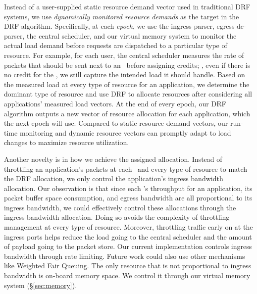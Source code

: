Instead of a user-supplied static resource demand vector used in traditional DRF systems, we use {\em dynamically monitored resource demands} as the target in the DRF algorithm.
Specifically, at each {\em epoch}, we use the ingress parser, egress de-parser, the central scheduler, and our virtual memory system to monitor the actual load demand before requests are dispatched to a particular type of resource.
For example, for each user, the central scheduler measures the rate of packets that should be sent next to an \nt\ before assigning credits; \ie, even if there is no credit for the \nt, we still capture the intended load it should handle.
Based on the measured load at every type of resource for an application, we determine the dominant type of resource and use DRF to allocate resources after considering all applications' measured load vectors.
At the end of every epoch, our DRF algorithm outputs a new vector of resource allocation for each application, which the next epoch will use.
Compared to static resource demand vectors, our run-time monitoring and dynamic resource vectors can promptly adapt to load changes to maximize resource utilization. %


Another novelty is in how we achieve the assigned allocation.
Instead of throttling an application's packets at each \nt\ and every type of resource to match the DRF allocation, we only control the application's ingress bandwidth allocation.
Our observation is that since each \nt's throughput for an application, its packet buffer space consumption, and egress bandwidth are all proportional to its ingress bandwidth, we could effectively control these allocations through the ingress bandwidth allocation.
Doing so avoids the complexity of throttling management at every type of resource.
Moreover, throttling traffic early on at the ingress ports helps reduce the load going to the central scheduler and the amount of payload going to the packet store.
Our current implementation controls ingress bandwidth through rate limiting.
Future work could also use other mechanisms like Weighted Fair Queuing.
The only resource that is not proportional to ingress bandwidth is on-board memory space.
We control it through our virtual memory system (\S\ref{sec:memory}).

